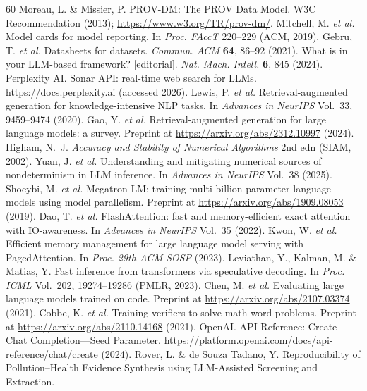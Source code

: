 \documentclass[sn-nature]{sn-jnl}
\begin{document}
\begin{thebibliography}{60}
Moreau, L. \& Missier, P.
PROV-DM: The PROV Data Model.
W3C Recommendation (2013); \url{https://www.w3.org/TR/prov-dm/}.
Mitchell, M. \emph{et al.}
Model cards for model reporting.
In \emph{Proc. FAccT} 220--229 (ACM, 2019).
Gebru, T. \emph{et al.}
Datasheets for datasets.
\emph{Commun. ACM} \textbf{64}, 86--92 (2021).
What is in your LLM-based framework? [editorial].
\emph{Nat. Mach. Intell.} \textbf{6}, 845 (2024).
Perplexity AI.
Sonar API: real-time web search for LLMs.
\url{https://docs.perplexity.ai} (accessed 2026).
Lewis, P. \emph{et al.}
Retrieval-augmented generation for knowledge-intensive NLP tasks.
In \emph{Advances in NeurIPS} Vol.~33, 9459--9474 (2020).
Gao, Y. \emph{et al.}
Retrieval-augmented generation for large language models: a survey.
Preprint at \url{https://arxiv.org/abs/2312.10997} (2024).
Higham, N.~J.
\emph{Accuracy and Stability of Numerical Algorithms} 2nd edn (SIAM, 2002).
Yuan, J. \emph{et al.}
Understanding and mitigating numerical sources of nondeterminism in LLM inference.
In \emph{Advances in NeurIPS} Vol.~38 (2025).
Shoeybi, M. \emph{et al.}
Megatron-LM: training multi-billion parameter language models using model parallelism.
Preprint at \url{https://arxiv.org/abs/1909.08053} (2019).
Dao, T. \emph{et al.}
FlashAttention: fast and memory-efficient exact attention with IO-awareness.
In \emph{Advances in NeurIPS} Vol.~35 (2022).
Kwon, W. \emph{et al.}
Efficient memory management for large language model serving with PagedAttention.
In \emph{Proc. 29th ACM SOSP} (2023).
Leviathan, Y., Kalman, M. \& Matias, Y.
Fast inference from transformers via speculative decoding.
In \emph{Proc. ICML} Vol.~202, 19274--19286 (PMLR, 2023).
Chen, M. \emph{et al.}
Evaluating large language models trained on code.
Preprint at \url{https://arxiv.org/abs/2107.03374} (2021).
Cobbe, K. \emph{et al.}
Training verifiers to solve math word problems.
Preprint at \url{https://arxiv.org/abs/2110.14168} (2021).
OpenAI. API Reference: Create Chat Completion---Seed Parameter.
\url{https://platform.openai.com/docs/api-reference/chat/create} (2024).
Rover, L. \& de Souza Tadano, Y.
Reproducibility of Pollution--Health Evidence Synthesis using LLM-Assisted Screening and Extraction.

\end{thebibliography}
\end{document}
